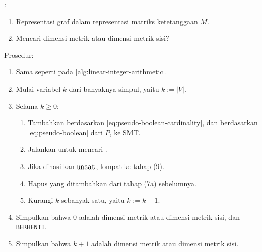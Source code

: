\begin{algorithm}[H]
	:
	\begin{enumerate}
		\item Representasi graf dalam representasi matriks ketetanggaan \(M\).
		\item Mencari dimensi metrik atau dimensi metrik sisi?
	\end{enumerate}
	Prosedur:
	\begin{enumerate}
		\item[1--5.] Sama seperti pada \autoref{alg:linear-integer-arithmetic}.
		\setcounter{enumi}{5}
		\item Mulai variabel \(k\) dari banyaknya simpul, yaitu \(k := |V|\).
		\item Selama \(k \geq 0\):
			\begin{enumerate}
					\item Tambahkan  berdasarkan \autoref{eq:pseudo-boolean-cardinality}, dan berdasarkan \autoref{eq:pseudo-boolean} dari \(P\), ke  SMT.
					\item Jalankan  untuk mencari .
					\item Jika dihasilkan \(\mathtt{unsat}\), lompat ke tahap (9).
					\item Hapus  yang ditambahkan dari tahap (7a) sebelumnya.
					\item Kurangi \(k\) sebanyak satu, yaitu \(k := k - 1\).
			\end{enumerate}
		\item Simpulkan bahwa 0 adalah dimensi metrik atau dimensi metrik sisi, dan \texttt{BERHENTI}.
		\item Simpulkan bahwa \(k + 1\) adalah dimensi metrik atau dimensi metrik sisi.
	\end{enumerate}
	\caption{}
	\label{alg:pseudo-boolean}
\end{algorithm}

\vspace{-1em}
